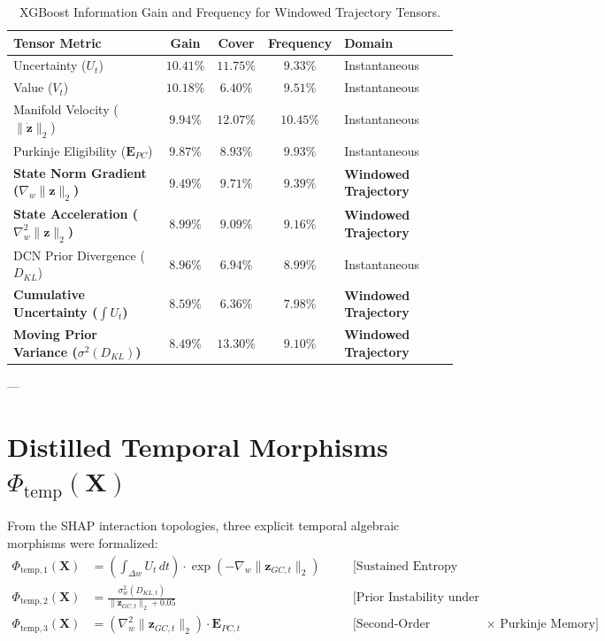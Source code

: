 \documentclass[11pt,twoside,a4paper]{article}
\begin{document}
\begin{table}[H]
\centering
\caption{XGBoost Information Gain and Frequency for Windowed Trajectory Tensors.}
\label{tab:xgb_imp}
\vspace{0.4em}
\small
\begin{tabular}{l c c c l}
\toprule
\textbf{Tensor Metric} & \textbf{Gain} & \textbf{Cover} & \textbf{Frequency} & \textbf{Domain} \\
\midrule
Uncertainty ($U_t$) & $10.41\%$ & $11.75\%$ & $9.33\%$ & Instantaneous \\
Value ($V_t$) & $10.18\%$ & $6.40\%$ & $9.51\%$ & Instantaneous \\
Manifold Velocity ($\|\dot{\mathbf{z}}\|_2$) & $9.94\%$ & $12.07\%$ & $10.45\%$ & Instantaneous \\
Purkinje Eligibility ($\mathbf{E}_{PC}$) & $9.87\%$ & $8.93\%$ & $9.93\%$ & Instantaneous \\
\textbf{State Norm Gradient ($\nabla_w \|\mathbf{z}\|_2$)} & $\mathbf{9.49\%}$ & $\mathbf{9.71\%}$ & $\mathbf{9.39\%}$ & \textbf{Windowed Trajectory} \\
\textbf{State Acceleration ($\nabla^2_w \|\mathbf{z}\|_2$)} & $\mathbf{8.99\%}$ & $\mathbf{9.09\%}$ & $\mathbf{9.16\%}$ & \textbf{Windowed Trajectory} \\
DCN Prior Divergence ($D_{KL}$) & $8.96\%$ & $6.94\%$ & $8.99\%$ & Instantaneous \\
\textbf{Cumulative Uncertainty ($\int U_t$)} & $\mathbf{8.59\%}$ & $\mathbf{6.36\%}$ & $\mathbf{7.98\%}$ & \textbf{Windowed Trajectory} \\
\textbf{Moving Prior Variance ($\sigma^2(D_{KL})$)} & $\mathbf{8.49\%}$ & $\mathbf{13.30\%}$ & $\mathbf{9.10\%}$ & \textbf{Windowed Trajectory} \\
\bottomrule
\end{tabular}
\end{table}

---

\section{Distilled Temporal Morphisms $\Phi_{\text{temp}}(\mathbf{X})$}

From the SHAP interaction topologies, three explicit temporal algebraic morphisms were formalized:
\begin{align}
\Phi_{\text{temp},1}(\mathbf{X}) &= \left(\int_{\Delta w} U_t \, dt\right) \cdot \exp\left( -\nabla_w \|\mathbf{z}_{GC,t}\|_2 \right) \quad &&\text{[Sustained Entropy under Collapsing Energy]} \\
\Phi_{\text{temp},2}(\mathbf{X}) &= \frac{\sigma^2_w(D_{KL,t})}{\|\dot{\mathbf{z}}_{GC,t}\|_2 + 0.05} \quad &&\text{[Prior Instability under Vanishing Flow Velocity]} \\
\Phi_{\text{temp},3}(\mathbf{X}) &= \left(\nabla^2_w \|\mathbf{z}_{GC,t}\|_2\right) \cdot \mathbf{E}_{PC,t} \quad &&\text{[Second-Order Deceleration $\times$ Purkinje Memory]}
\end{align}
\end{document}
